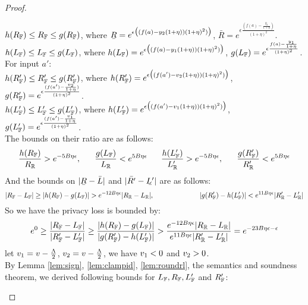 \documentclass[a4paper,11pt]{article}
\begin{document}
\begin{proof}
\begin{itemize}
		$h(R_{\mathbb{F}}) \leq R_{\mathbb{F}} \leq g(R_{\mathbb{F}})$, where
%
		$\ubar{R} = e^{\epsilon 
				\big( (f(a) - y_2(1 + \eta)) (1 + \eta)^2) \big)}$, 
		$\bar{R} = e^{\epsilon 
				\frac{(f(a) - \frac{y_2}{1 + \eta})}{(1 + \eta)^2}}$.  
		\\
		$h(L_{\mathbb{F}}) \leq L_{\mathbb{F}} \leq g(L_{\mathbb{F}})$, where
%
		$h(L_{\mathbb{F}}) = e^{\epsilon 
				\big( (f(a) - y_1(1 + \eta)) (1 + \eta)^2) \big)}$, 
		$g(L_{\mathbb{F}}) = e^{\epsilon 
				\frac{f(a) - \frac{y_1}{1 + \eta}}{(1 + \eta)^2}}$.
		\\
		For input $a'$:
		\\
		$h(R_{\mathbb{F}}') \leq R_{\mathbb{F}}' \leq g(R_{\mathbb{F}}')$, where
%
		$h(R_{\mathbb{F}}') = e^{\epsilon 
				\big( (f(a') - v_2(1 + \eta)) (1 + \eta)^2) \big)}$, 
		$g(R_{\mathbb{F}}') = e^{\epsilon 
				\frac{(f(a') - \frac{v_2}{1 + \eta})}{(1 + \eta)^2}}$.
		\\
		$h(L_{\mathbb{F}}') \leq L_{\mathbb{F}}' \leq g(L_{\mathbb{F}}')$, where
		$h(L_{\mathbb{F}}') = e^{\epsilon 
				\big( (f(a') - v_1(1 + \eta) ) (1 + \eta)^2) \big)}$,
		$g(L_{\mathbb{F}}') = e^{\epsilon 
				\frac{(f(a') - \frac{v_1}{1 + \eta}}{(1 + \eta)^2}}$.
		\\
		The bounds on their ratio are as follows:
		\[
		\frac{h(R_{\mathbb{F}})}{R_{\mathbb{R}}} > e^{-5B\eta \epsilon}, 
		~~~~~
		\frac{g(L_{\mathbb{F}})}{L_{\mathbb{R}}} < e^{5B\eta \epsilon}
		~~~~~
		\frac{h(L_{\mathbb{F}}')}{L_{\mathbb{R}}'} > e^{-5B\eta \epsilon}, 
		~~~~~
		\frac{g(R_{\mathbb{F}}')}{R_{\mathbb{R}}'} < e^{5B\eta \epsilon}
		\]
		And the bounds on $|\ubar{R} - \bar{L}|$ and $|\bar{R'} - \ubar{L'}|$ are as follows:
		\[
		|R_{\mathbb{F}} - L_{\mathbb{F}}|
		\geq
		|h(R_{\mathbb{F}}) - g(L_{\mathbb{F}})| 
		> e^{-12 B\eta \epsilon}|R_{\mathbb{R}} - L_{\mathbb{R}}|, 
		~~~~~~~~~~~~~~~~~~~~
		|g(R_{\mathbb{F}}') - h(L_{\mathbb{F}}')| 
		< e^{11 B\eta \epsilon}|R_{\mathbb{R}}' - L_{\mathbb{R}}'|
		\]
		So we have the privacy loss is bounded by:
		\[
		e^0 
		\geq
		\frac{|R_{\mathbb{F}} - L_{\mathbb{F}}|}{|R_{\mathbb{F}}' - L_{\mathbb{F}}'|}
		\geq
		\frac{|h(R_{\mathbb{F}}) - g(L_{\mathbb{F}})|}
		{|g(R_{\mathbb{F}}') - h(L_{\mathbb{F}}')|}
		> \frac{e^{-12 B\eta \epsilon}|R_{\mathbb{R}} - L_{\mathbb{R}}|}
		{e^{11 B\eta \epsilon}|R_{\mathbb{R}}' - L_{\mathbb{R}}'|}
		= e^{-23B \eta \epsilon - \epsilon}
		\]
		let $v_1 = v - \frac{\Lambda}{2}$, 
		$v_2 = v - \frac{\Lambda}{2}$, 
		we have $v_1 < 0$ and $v_2 > 0$.
		\\
		By Lemma \ref{lem:sign}, \ref{lem:clampid}, \ref{lem:roundrl}, the semantics and soundness theorem, we derived following bounds for $L_{\mathbb{F}}, R_{\mathbb{F}}, L_{\mathbb{F}}'$ and $R_{\mathbb{F}}'$:
		\\

\end{itemize}
\end{proof}
\end{document}
